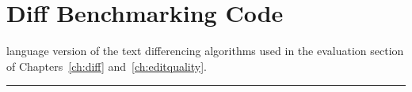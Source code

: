 \chapter{\ocaml Diff Benchmarking Code}
\label{app:diffsrc-ocaml}

\ocaml language version of the text differencing algorithms
used in the evaluation section of Chapters~\ref{ch:diff}
and~\ref{ch:editquality}.

\vspace{1em}
\hrule
\vspace{1em}

{\singlespacing\small

}


